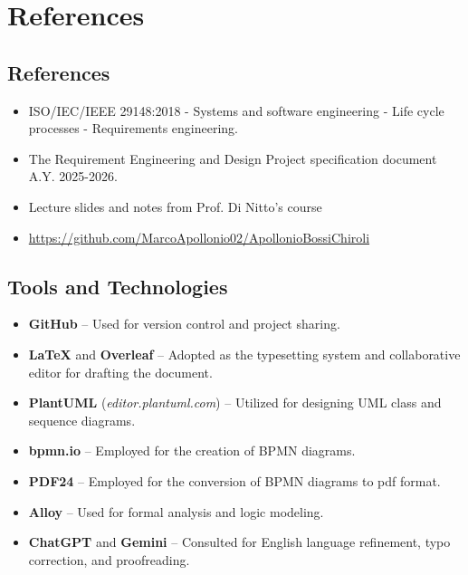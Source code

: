 \chapter{References}
\label{ch:references}

\section{References}
\label{sec:references}

\begin{itemize}
    \item ISO/IEC/IEEE 29148:2018 - Systems and software engineering - Life cycle processes - Requirements engineering.
    \item The Requirement Engineering and Design Project specification document A.Y. 2025-2026.
    \item Lecture slides and notes from Prof. Di Nitto's course
    \item \url{https://github.com/MarcoApollonio02/ApollonioBossiChiroli}
\end{itemize}

\section{Tools and Technologies} %
\label{sec:tools}

\begin{itemize}
    \item \textbf{GitHub} -- Used for version control and project sharing.
    \item \textbf{\LaTeX{}} and \textbf{Overleaf} -- Adopted as the typesetting system and collaborative editor for drafting the document.
    \item \textbf{PlantUML} (\textit{editor.plantuml.com}) -- Utilized for designing UML class and sequence diagrams.
    \item \textbf{bpmn.io} -- Employed for the creation of BPMN diagrams.
    \item \textbf{PDF24} -- Employed for the conversion of BPMN diagrams to pdf format.
    \item \textbf{Alloy} -- Used for formal analysis and logic modeling.
    \item \textbf{ChatGPT} and \textbf{Gemini} -- Consulted for English language refinement, typo correction, and proofreading.
\end{itemize}
